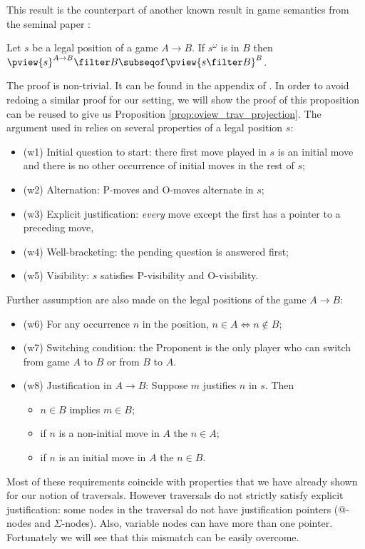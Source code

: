 This result is the counterpart of another known result in game semantics from the seminal paper \cite{hylandong_pcf}:
\begin{proposition}{\cite[Prop.4.3]{hylandong_pcf}}
\label{prop:hylandong_pviewprojection}
  Let $s$ be a legal position of a game $A\rightarrow B$.
  If $s^\omega$ is in $B$ then $\pview{s}^{A\rightarrow B} \filter B \subseqof \pview{s\filter B}^B$.
\end{proposition}
The proof is non-trivial. It can be found in the appendix of
\cite{hylandong_pcf}. In order to avoid redoing a similar proof for
our setting, we will show the proof of this proposition can be
reused to give us Proposition \ref{prop:oview_trav_projection}. The
argument used in \cite{hylandong_pcf} relies on several properties
of a legal position $s$:
\begin{itemize}
  \item (w1) Initial question to start: there first move played in $s$ is an initial move and there is no other occurrence of initial moves in the rest of $s$;
  \item(w2) Alternation: P-moves and O-moves alternate in $s$;
  \item(w3)  Explicit justification: \emph{every} move except the first has a pointer to a preceding move,
  \item(w4)  Well-bracketing: the pending question is answered first;
  \item(w5)  Visibility: $s$ satisfies P-visibility and
O-visibility.
\end{itemize}
Further assumption are also made on the legal positions of the game
$A\rightarrow B$:
\begin{itemize}
  \item(w6) For any occurrence $n$ in the position, $n \in A \iff n \not\in
B$;
  \item(w7) Switching condition: the Proponent is the only player
      who can switch from game $A$ to $B$ or from $B$ to $A$.
  \item(w8) Justification in $A\rightarrow B$: Suppose $m$ justifies $n$ in $s$. Then
    \begin{itemize}
        \item $n \in B$ implies $m\in B$;
        \item if $n$ is a non-initial move in $A$ the $n \in A$;
        \item if $n$ is an initial move in $A$ the $n \in B$.
    \end{itemize}
\end{itemize}
Most of these requirements coincide with properties that we have
already shown for our notion of traversals. However traversals do
not strictly satisfy explicit justification: some nodes in the
traversal do not have justification pointers (@-nodes and
$\Sigma$-nodes). Also, variable nodes can have more than one
pointer. Fortunately we will see that this mismatch can be easily
overcome.


